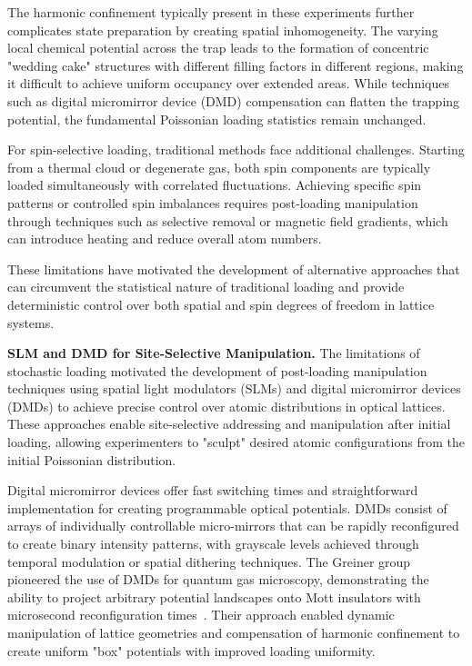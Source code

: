 The harmonic confinement typically present in these experiments further complicates state preparation by creating spatial inhomogeneity. The varying local chemical potential across the trap leads to the formation of concentric "wedding cake" structures with different filling factors in different regions, making it difficult to achieve uniform occupancy over extended areas. While techniques such as digital micromirror device (DMD) compensation can flatten the trapping potential, the fundamental Poissonian loading statistics remain unchanged.

For spin-selective loading, traditional methods face additional challenges. Starting from a thermal cloud or degenerate gas, both spin components are typically loaded simultaneously with correlated fluctuations. Achieving specific spin patterns or controlled spin imbalances requires post-loading manipulation through techniques such as selective removal or magnetic field gradients, which can introduce heating and reduce overall atom numbers.

These limitations have motivated the development of alternative approaches that can circumvent the statistical nature of traditional loading and provide deterministic control over both spatial and spin degrees of freedom in lattice systems.


\textbf{SLM and DMD for Site-Selective Manipulation.}
The limitations of stochastic loading motivated the development of post-loading manipulation techniques using spatial light modulators (SLMs) and digital micromirror devices (DMDs) to achieve precise control over atomic distributions in optical lattices. These approaches enable site-selective addressing and manipulation after initial loading, allowing experimenters to "sculpt" desired atomic configurations from the initial Poissonian distribution.

Digital micromirror devices offer fast switching times and straightforward implementation for creating programmable optical potentials. DMDs consist of arrays of individually controllable micro-mirrors that can be rapidly reconfigured to create binary intensity patterns, with grayscale levels achieved through temporal modulation or spatial dithering techniques. The Greiner group pioneered the use of DMDs for quantum gas microscopy, demonstrating the ability to project arbitrary potential landscapes onto Mott insulators with microsecond reconfiguration times~\cite{mazurenko_cold-atom_2017}. Their approach enabled dynamic manipulation of lattice geometries and compensation of harmonic confinement to create uniform "box" potentials with improved loading uniformity.

